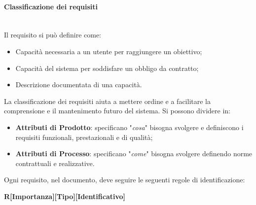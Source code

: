 \paragraph{Classificazione dei requisiti} \-\\
Il requisito si può definire come:
\begin{itemize}
	\item Capacità necessaria a un utente per raggiungere un obiettivo;
	\item Capacità del sistema per soddisfare un obbligo da contratto;
	\item Descrizione documentata di una capacità.
\end{itemize}
La classificazione dei requisiti aiuta a mettere ordine e a facilitare la comprensione e il mantenimento futuro del sistema. Si possono dividere in:
\begin{itemize}
	\item \textbf{Attributi di Prodotto}: specificano "\textit{cosa}" bisogna svolgere e definiscono i requisiti funzionali, prestazionali e di qualità;
	\item \textbf{Attributi di Processo}: specificano "\textit{come}" bisogna svolgere definendo norme contrattuali e realizzative. 
\end{itemize}
Ogni requisito, nel documento, deve seguire le seguenti regole di identificazione:
\begin{center}
\textbf{R[Importanza][Tipo][Identificativo]}
\end{center}  

